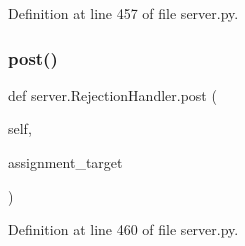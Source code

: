 Definition at line 457 of file server.\+py.

\mbox{\label{classserver_1_1RejectionHandler_ac442a5bf81064a282b5f2ff706ab5b6b}} 
\subsubsection{\texorpdfstring{post()}{post()}}
{\footnotesize\ttfamily def server.\+Rejection\+Handler.\+post (\begin{DoxyParamCaption}\item[{}]{self,  }\item[{}]{assignment\+\_\+target }\end{DoxyParamCaption})}



Definition at line 460 of file server.\+py.



